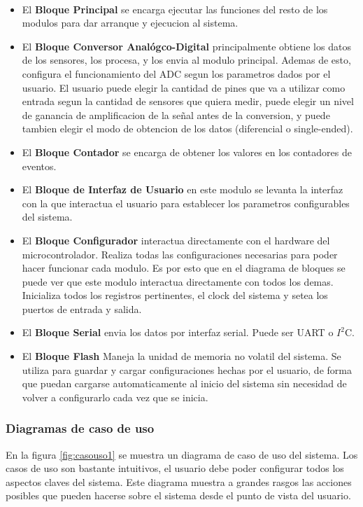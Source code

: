 \documentclass{article}
\theoremstyle{definition}
\theoremstyle{remark}
\begin{document}
\paragraph{}


\begin{itemize}
  \item El \textbf{Bloque Principal} se encarga ejecutar las funciones del resto de los modulos para dar arranque y ejecucion al sistema.
  \item El \textbf{Bloque Conversor Analógco-Digital} principalmente obtiene los datos de los sensores, los procesa, y los envia al modulo principal. Ademas de esto, configura el funcionamiento del ADC segun los parametros dados por el usuario. El usuario puede elegir la cantidad de pines que va a utilizar como entrada segun la cantidad de sensores que quiera medir, puede elegir un nivel de ganancia de amplificacion de la señal antes de la conversion, y puede tambien elegir el modo de obtencion de los datos (diferencial o single-ended).
  \item El \textbf{Bloque Contador} se encarga de obtener los valores en los contadores de eventos.
  \item El \textbf{Bloque de Interfaz de Usuario} en este modulo se levanta la interfaz con la que interactua el usuario para establecer los parametros configurables del sistema.
  \item El \textbf{Bloque Configurador} interactua directamente con el hardware del microcontrolador. Realiza todas las configuraciones necesarias para poder hacer funcionar cada modulo. Es por esto que en el diagrama de bloques se puede ver que este modulo interactua directamente con todos los demas. Inicializa todos los registros pertinentes, el clock del sistema y setea los puertos de entrada y salida.
  \item El \textbf{Bloque Serial} envia los datos por interfaz serial. Puede ser UART o $I^{2}$C.
  \item El \textbf{Bloque Flash} Maneja la unidad de memoria no volatil del sistema. Se utiliza para guardar y cargar configuraciones hechas por el usuario, de forma que puedan cargarse automaticamente al inicio del sistema sin necesidad de volver a configurarlo cada vez que se inicia.
\end{itemize}

\subsubsection{Diagramas de caso de uso}
En la figura \ref{fig:casouso1} se muestra un diagrama de caso de uso del sistema. Los casos de uso son bastante intuitivos, el usuario debe poder configurar todos los aspectos claves del sistema. Este diagrama muestra a grandes rasgos las acciones posibles que pueden hacerse sobre el sistema desde el punto de vista del usuario.
\end{document}

